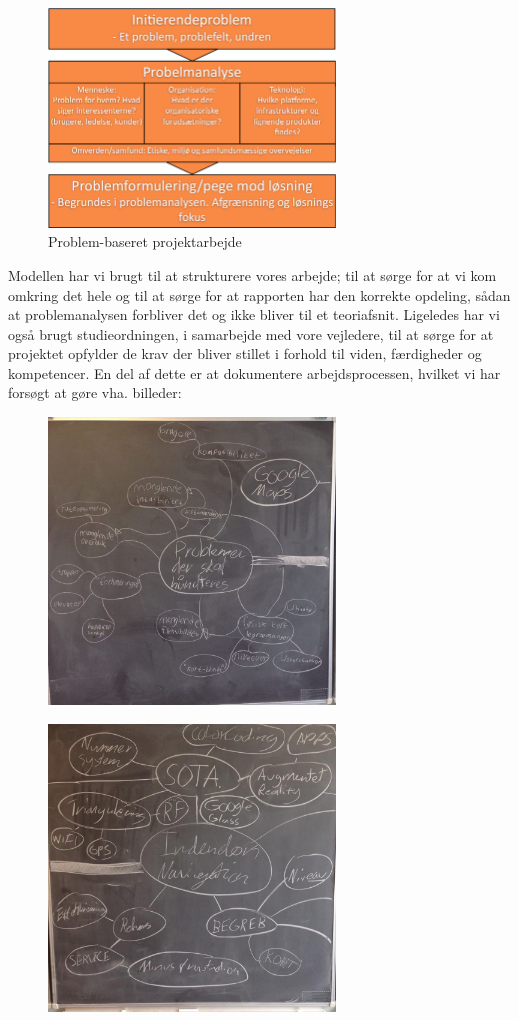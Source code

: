 \documentclass[article,oneside,12pt]{memoir}
\begin{document}
\begin{figure}[h]
    \centering  
    \includegraphics[width=3in]{orange.png}
    \caption{Problem-baseret projektarbejde}
\end{figure}
Modellen har vi brugt til at strukturere vores arbejde; til at sørge for at vi kom omkring det hele og til at sørge for at rapporten har den korrekte opdeling, sådan at problemanalysen forbliver det og ikke bliver til et teoriafsnit.
Ligeledes har vi også brugt studieordningen, i samarbejde med vore vejledere, til at sørge for at projektet opfylder de krav der bliver stillet i forhold til viden, færdigheder og kompetencer.
\clearpage
En del af dette er at dokumentere arbejdsprocessen, hvilket vi har forsøgt at gøre vha. billeder:
\begin{figure}[ht!]
    \centering
    \includegraphics[width=3in]{tavle1.jpg}
\end{figure}
\begin{figure}[ht!]
    \centering
    \includegraphics[width=3in]{billede2.jpg}
\end{figure}
\end{document}
